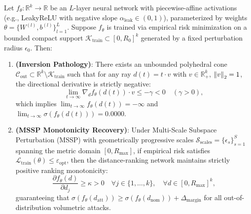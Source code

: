 \begin{theorem}
\label{thm:distance_inversion}
Let $f_\theta: \mathbb{R}^k \to \mathbb{R}$ be an $L$-layer neural network with piecewise-affine activations (e.g., LeakyReLU with negative slope $\alpha_{\text{leak}} \in (0, 1)$), parameterized by weights $\theta = \{W^{(l)}, b^{(l)}\}_{l=1}^L$. Suppose $f_\theta$ is trained via empirical risk minimization on a bounded compact support $\mathcal{K}_{\text{train}} \subset [0, R_0]^k$ generated by a fixed perturbation radius $\epsilon_0$. Then:
\begin{enumerate}
    \item \textbf{(Inversion Pathology)}: There exists an unbounded polyhedral cone $\mathcal{C}_{\text{out}} \subset \mathbb{R}^k \setminus \mathcal{K}_{\text{train}}$ such that for any ray $d(t) = t \cdot v$ with $v \in \mathbb{R}_+^k$, $\left\lVert v\right\rVert_2 = 1$, the directional derivative is strictly negative:
    \begin{equation}
    \label{eq:thm1_inversion}
    \lim_{t \to \infty} \nabla_d f_\theta(d(t)) \cdot v \le -\gamma < 0 \quad (\gamma > 0),
    \end{equation}
    which implies $\lim_{t \to \infty} f_\theta(d(t)) = -\infty$ and $\lim_{t \to \infty} \sigma(f_\theta(d(t))) = 0.0000$.
    \item \textbf{(MSSP Monotonicity Recovery)}: Under Multi-Scale Subspace Perturbation (MSSP) with geometrically progressive scales $\mathcal{S}_{\text{scales}} = \{\epsilon_s\}_{s=1}^S$ spanning the metric domain $[0, R_{\max}]$, if empirical risk satisfies $\mathcal{L}_{\text{train}}(\theta) \le \varepsilon_{\text{opt}}$, then the distance-ranking network maintains strictly positive ranking monotonicity:
    \begin{equation}
    \label{eq:thm1_recovery}
    \frac{\partial f_\theta(d)}{\partial d_j} \ge \kappa > 0 \quad \forall j \in \{1, \dots, k\}, \quad \forall d \in [0, R_{\max}]^k,
    \end{equation}
    guaranteeing that $\sigma(f_\theta(d_{\text{att}})) \ge \sigma(f_\theta(d_{\text{nom}})) + \Delta_{\text{margin}}$ for all out-of-distribution volumetric attacks.
\end{enumerate}
\end{theorem}

